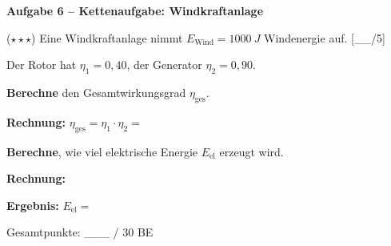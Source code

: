 \documentclass[11pt, a4paper]{article}
\newcommand{\luecke}[1]{\underline{\hspace{#1}}}
\newcommand{\punktebox}[1]{\hfill\small\textcolor{mittelgrau}{[\_\_/#1]}}
\newcommand{\aufgabe}[1]{%
    \needspace{4\baselineskip}%
    \vspace{10pt}%
    \noindent\textbf{\textcolor{fachfarbe}{Aufgabe #1}}%
    \vspace{4pt}%
    \nopagebreak[4]%
}
\newcommand{\operator}[1]{\textbf{\textcolor{fachfarbe}{#1}}}
\begin{document}
\vspace{0.5em}

\aufgabe{6 – Kettenaufgabe: Windkraftanlage}

($\star\star\star$) Eine Windkraftanlage nimmt $E_\text{Wind} = \SI{1000}{J}$ Windenergie auf. \punktebox{5}

Der Rotor hat $\eta_1 = 0{,}40$, der Generator $\eta_2 = 0{,}90$.

\begin{teil}
\item \operator{Berechne} den Gesamtwirkungsgrad $\eta_\text{ges}$.

\vspace{4pt}
\textbf{Rechnung:} $\eta_\text{ges} = \eta_1 \cdot \eta_2 = $ \luecke{3cm}

\vspace{4pt}

\item \operator{Berechne}, wie viel elektrische Energie $E_\text{el}$ erzeugt wird.

\vspace{6pt}
\textbf{Rechnung:}

\vspace{2em}

\textbf{Ergebnis:} $E_\text{el} = $ \luecke{2cm}
\end{teil}


\vfill
\begin{center}
\small\textcolor{mittelgrau}{Gesamtpunkte: \_\_\_ / 30 BE}
\end{center}
\end{document}
